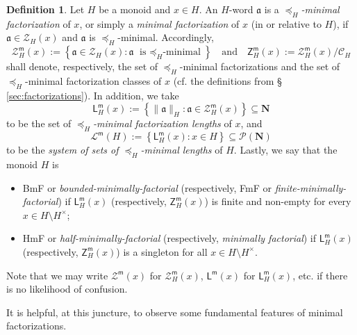 \documentclass{report}
\newcommand{\m}{{\mathsf{m}}}
\renewcommand{\:}{\text{:}}
\theoremstyle{definition}
\newtheorem{defn}{Definition}[section]
\begin{document}
%
\begin{defn}\label{min-fac}
	Let $H$ be a monoid and $x \in H$. An $H$-word $\mathfrak{a}$ is a \textit{$\preceq_H$-minimal factorization} of $x$, or simply a \textit{minimal factorization} of $x$ (in or relative to $H$), if $\mathfrak a \in \mathcal Z_H(x)$ and $\mathfrak a$ is $\preceq_H$-minimal.
	Accordingly, 
	\[
	\mathcal{Z}_{H}^\m(x) := \left\{ \mathfrak{a}\in \mathcal{Z}_H(x): \mathfrak{a} \textrm{ is $\preceq_H$-minimal} \right\}
	\quad\text{and}\quad
	\mathsf{Z}_{H}^\m(x):= \mathcal{Z}_{H}^\m(x)/\mathscr{C}_H
	\]
	shall denote, respectively, the set of $\preceq_H$-minimal factorizations and the set of $\preceq_H$-minimal factorization classes of $x$ (cf. the definitions from \S{ }\ref{sec:factorizations}). In addition, we take 
	\[
	\mathsf{L}_{H}^\m(x) := \left\{ \|\mathfrak{a}\|_H : \mathfrak{a} \in \mathcal{Z}_{H}^\m(x) \right\} \subseteq \mathbf N
	\]
	to be the set of \textit{$\preceq_H$-minimal factorization lengths} of $x$, and
	\[
	\mathcal{L}^\m(H) := \left\{ \mathsf{L}_{H}^\m(x) : x\in H \right\} \subseteq \mathcal P(\mathbf N)
	\]
	to be the \textit{system of sets of $\preceq_H$-minimal lengths} 
	of $H$.
	Lastly, we say that the monoid $H$ is
	\begin{itemize}
		\item \textup{BmF} 
		or \textit{bounded-minimally-factorial} (respectively, \textup{FmF} or \textit{finite-minimally-factorial}) if $\mathsf{L}_{H}^\m(x)$ (respectively, $\mathsf{Z}_{H}^\m(x)$) is finite and non-empty for every $x\in H\setminus H^\times$;
		\item \textup{HmF} or \textit{half-minimally-factorial} (respectively, \textit{minimally factorial}) if $\mathsf{L}_{H}^\m(x)$ (respectively, $\mathsf{Z}_{H}^\m(x)$) is a singleton for all $x \in H \setminus H^\times$.
	\end{itemize}
	Note that we may write $\mathcal{Z}^\m(x)$ for $\mathcal{Z}_{H}^\m(x)$, $\mathsf {L}^\m(x)$ for $\mathsf {L}_{H}^\m(x)$, etc. if there is no likelihood of confusion.
\end{defn}
%
It is helpful, at this juncture, to observe some fundamental features of minimal factorizations.
%
\end{document}
